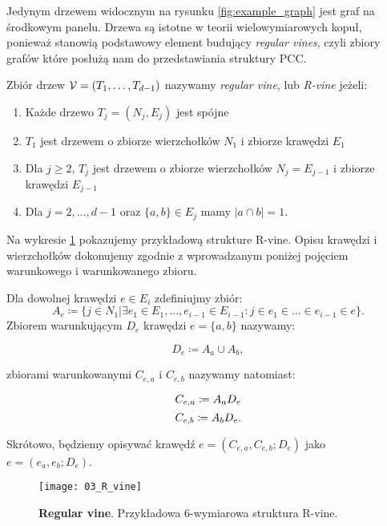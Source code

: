 Jedynym drzewem widocznym na rysunku \ref{fig:example_graph} jest graf na środkowym panelu. Drzewa są istotne w teorii wielowymiarowych kopuł, ponieważ stanowią podstawowy element budujący \emph{regular vines}, czyli zbiory grafów które posłużą nam do przedstawiania struktury PCC.

\begin{df}
	Zbiór drzew $\mathcal{V} = (T_1,\dots, T_{d-1})$ nazywamy \emph{regular vine}, lub \emph{R-vine} jeżeli:
	
	\begin{enumerate}
		\item Każde drzewo $T_j=(N_j, E_j)$ jest spójne
		\item $T_1$ jest drzewem o zbiorze wierzchołków $N_1$ i zbiorze krawędzi $E_1$
		\item Dla $j\geqslant2$, $T_j$ jest drzewem o zbiorze wierzchołków $N_j = E_{j-1}$ i zbiorze krawędzi $E_{j-1}$
		\item Dla $j = 2, \dots, d- 1$ oraz $\{a, b\} \in E_j$ mamy $ \vert a \cap b \vert = 1$. 
	\end{enumerate}
\end{df}

Na wykresie \ref{fig:r_vine} pokazujemy przykładową strukture R-vine. Opisu krawędzi i wierzchołków dokonujemy zgodnie z wprowadzanym poniżej pojęciem warunkowego i warunkowanego zbioru.

\begin{df}
	Dla dowolnej krawędzi $e\in E_i$ zdefiniujmy zbiór:
	$$ A_e\coloneqq \{j\in N_1\vert \exists e_1 \in E_1, \dots, e_{i-1}\in E_{i-1}: j\in e_1\in \dots \in e_{i-1}\in e\}.$$
	Zbiorem warunkującym $D_e$ krawędzi $e=\{a, b\}$ nazywamy:
	
	$$ D_e \coloneqq A_a \cup A_b,$$
	
	zbiorami warunkowanymi $C_{e, a}$ i $C_{e, b}$ nazywamy natomiast:
	
	$$ C_{e, a} \coloneqq A_a\\ D_e$$
	$$ C_{e, b} \coloneqq A_b\\ D_e.$$
	
	Skrótowo, będziemy opisywać krawędź $e = (C_{e, a}, C_{e, b}; D_e)$ jako $e = (e_a, e_b; D_e)$.
\end{df}


\begin{figure}[h]
	\centering
	\texttt{[image: 03\_R\_vine]}
	
	\caption{\textbf{Regular vine}. Przykładowa 6-wymiarowa struktura R-vine. \label{fig:r_vine}}
\end{figure}

